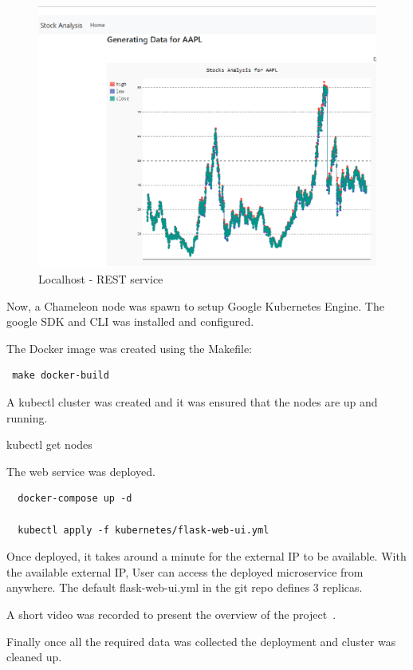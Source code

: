 \begin{figure}[htb]
	\centering\includegraphics[width=\columnwidth]{images/hid_417_localhost.png}
  \caption{Localhost - REST service}
  \label{fig:project_localhost}
\end{figure}

Now, a Chameleon node was spawn to setup Google Kubernetes Engine. The google
SDK and CLI was installed and configured. 

The Docker image was created using the Makefile:
\begin{verbatim}
 make docker-build
\end{verbatim}
A kubectl cluster was created and it was ensured that the nodes are up and
running.

kubectl get nodes

The web service was deployed.

\begin{verbatim}
  docker-compose up -d

  kubectl apply -f kubernetes/flask-web-ui.yml
\end{verbatim}

Once deployed, it takes around a minute for the external IP to be available.
With the available external IP, User can access the deployed microservice from
anywhere. The default flask-web-ui.yml in the git repo defines 3 replicas.

A short video was recorded to present the overview of the
project~\cite{hid-sp18-417-project_overview}.

Finally once all the required data was collected the deployment and cluster
was cleaned up.

